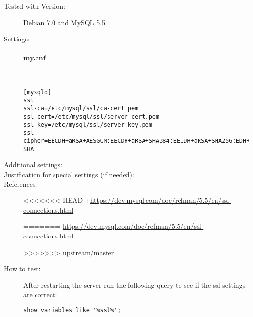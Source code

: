 \begin{description}
\item[Tested with Version:] Debian 7.0 and MySQL 5.5

\item[Settings:] \mbox{}

\paragraph*{my.cnf}\mbox{}\\

\begin{lstlisting}[breaklines]
[mysqld]
ssl
ssl-ca=/etc/mysql/ssl/ca-cert.pem
ssl-cert=/etc/mysql/ssl/server-cert.pem
ssl-key=/etc/mysql/ssl/server-key.pem
ssl-cipher=EECDH+aRSA+AESGCM:EECDH+aRSA+SHA384:EECDH+aRSA+SHA256:EDH+CAMELLIA256:EECDH:EDH+aRSA:+SSLv3:!aNULL:!eNULL:!LOW:!3DES:!MD5:!EXP:!PSK:!SRP:!DSS:!RC4:!SEED:!AES128:!CAMELLIA128:!ECDSA:AES256-SHA
\end{lstlisting}

\item[Additional settings:]


\item[Justification for special settings (if needed):]


\item[References:]
<<<<<<< HEAD
+{\small \url{https://dev.mysql.com/doc/refman/5.5/en/ssl-connections.html}}


=======
{\small \url{https://dev.mysql.com/doc/refman/5.5/en/ssl-connections.html}}

>>>>>>> upstream/master

\item[How to test:]

After restarting the server run the following query to see if the ssl settings are correct:
\begin{lstlisting}[breaklines]
show variables like '%ssl%';
\end{lstlisting}


\end{description}



